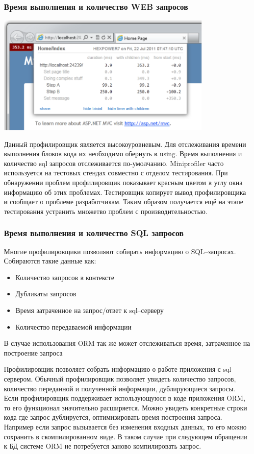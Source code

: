 \documentclass{../industrial-development}
\begin{document}
\begin{frame} \frametitle{Время выполнения и количество WEB запросов}
	\centerline{\includegraphics[width=0.8\textwidth]{miniprofiler2.pdf}}
\end{frame}
\lecturenotes
Данный профилировщик является высокоуровневым. Для отслеживания времени выполнения блоков кода их необходимо обернуть в using. Время выполнения и количество sql запросов отслеживается по-умолчанию. Miniprofiler часто используется на тестовых стендах совместно с отделом тестирования. При обнаружении проблем профилировщик показывает красным цветом в углу окна информацию об этих проблемах. Тестировщик копирует вывод профилировщика и сообщает о проблеме разработчикам. Таким образом получается ещё на этапе тестирования устранить множетво проблем с производительностью.


\begin{frame} \frametitle{Время выполнения и количество SQL запросов}
	\begin{block}{}
		Многие профилировщики позволяют \alert{собирать информацию о SQL--запросах}. Собираются такие данные как:
	\end{block}

	\begin{itemize}
	\item Количество запросов в контексте
	\item Дубликаты запросов
	\item Время затраченное на запрос/ответ к sql--серверу
	\item Количество передаваемой информации
	\end{itemize}

	\begin{block}{}
		В случае использования ORM так же может отслеживаться время, затраченное на построение запроса
	\end{block}
\end{frame}
\lecturenotes
Профилировщик позволяет собрать информацию о работе приложения с sql-сервером. Обычный профилировщик позволяет увидеть количество запросов, количество переданной и полученной информации, дублирующиеся запросы. Если профилировщик поддерживает использующуюся в коде приложения ORM, то его функционал значительно расширяется. Можно увидеть конкретные строки кода где запрос дублируется, оптимизировать время построения запроса. Например если запрос вызывается без изменения входных данных, то его можно сохранить в скомпилированном виде. В таком случае при следующем обращении к БД системе ORM не потребуется заново компилировать запрос.
\end{document}
